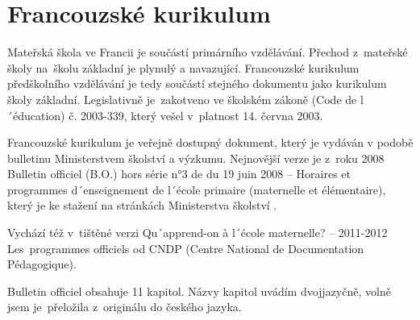	\section{Francouzské kurikulum}

		Mateřská škola ve Francii je součástí primárního vzdělávání. Přechod z mateřské školy na školu základní je plynulý a navazující. Francouzské kurikulum předškolního vzdělávání je tedy součástí stejného dokumentu jako kurikulum školy základní. Legislativně je zakotveno ve školském zákoně (Code de l´éducation) č. 2003-339, který vešel v platnost 14. června 2003.
	
		Francouzské kurikulum je veřejně dostupný dokument, který je vydáván v podobě bulletinu Ministerstvem školství a výzkumu. Nejnovější verze je z roku 2008 Bulletin officiel (B.O.) hors série n°3 de du 19 juin 2008 – Horaires et programmes d´enseignement de l´école primaire (maternelle et élémentaire), který je ke stažení na stránkách Ministerstva školství \citep{}.

		Vychází též v tištěné verzi Qu´apprend-on à l´école maternelle? – 2011-2012 Les programmes officiels od CNDP (Centre National de Documentation Pédagogique)\citep{}.

		Bulletin officiel obsahuje 11 kapitol. Názvy kapitol uvádím dvojjazyčně, volně jsem je přeložila z originálu do českého jazyka.

